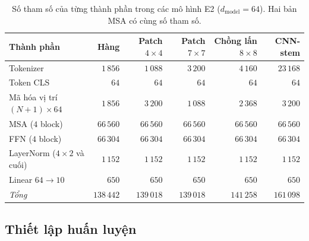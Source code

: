 \documentclass[a4paper,12pt]{article}
\begin{document}
\begin{table}[htbp]
    \centering
    \caption{Số tham số của từng thành phần trong các mô hình E2 ($d_{\text{model}}=64$). Hai bản MSA có cùng số tham số.}
    \label{tab:e2-arch}
    \small
    \setlength{\tabcolsep}{3.5pt}
    \begin{tabular}{lrrrrr}
        \toprule
        Thành phần                      & Hàng       & Patch $4\times4$ & Patch $7\times7$ & Chồng lấn $8\times8$ & CNN-stem   \\
        \midrule
        Tokenizer                       & $1\,856$   & $1\,088$         & $3\,200$         & $4\,160$             & $23\,168$  \\
        Token CLS                       & $64$       & $64$             & $64$             & $64$                 & $64$       \\
        Mã hóa vị trí $(N{+}1)\times64$ & $1\,856$   & $3\,200$         & $1\,088$         & $2\,368$             & $3\,200$   \\
        MSA ($4$ block)                 & $66\,560$  & $66\,560$        & $66\,560$        & $66\,560$            & $66\,560$  \\
        FFN ($4$ block)                 & $66\,304$  & $66\,304$        & $66\,304$        & $66\,304$            & $66\,304$  \\
        LayerNorm ($4\times2$ và cuối)  & $1\,152$   & $1\,152$         & $1\,152$         & $1\,152$             & $1\,152$   \\
        Linear $64\to10$                & $650$      & $650$            & $650$            & $650$                & $650$      \\
        \midrule
        \textit{Tổng}                   & $138\,442$ & $139\,018$       & $139\,018$       & $141\,258$           & $161\,098$ \\
        \bottomrule
    \end{tabular}
\end{table}

\subsection{Thiết lập huấn luyện}
\label{sec:e2-setup}
\end{document}
